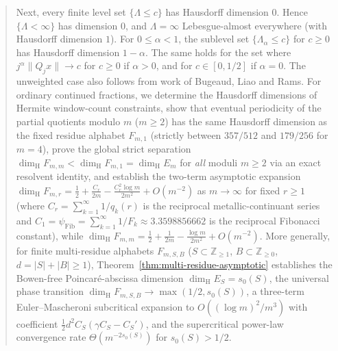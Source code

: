 \documentclass[11pt]{article}
\theoremstyle{definition}
\theoremstyle{remark}
\newcommand{\Z}{\mathbb{Z}}
\newcommand{\dimH}{\dim_{\mathrm{H}}}
\newcommand{\Lam}{\Lambda}
\begin{document}
\begin{abstract}
Next, every finite level set $\{\Lam\le c\}$ has Hausdorff dimension $0$.
Hence $\{\Lam<\infty\}$ has dimension $0$, and $\Lam=\infty$ Lebesgue-almost
everywhere (with Hausdorff dimension $1$). For $0\le\alpha<1$, the sublevel set $\{\Lam_\alpha\le c\}$ for $c\ge0$
has Hausdorff dimension $1-\alpha$. The same holds for the set where
$j^\alpha\|Q_jx\|\to c$ for $c\ge0$ if $\alpha>0$, and for
$c\in[0,1/2]$ if $\alpha=0$. The unweighted case also follows from work
of Bugeaud, Liao and Rams. For ordinary continued fractions,
we determine the Hausdorff dimensions of Hermite window-count constraints,
show that eventual periodicity of the partial quotients modulo $m$ ($m\ge2$) has
the same Hausdorff dimension as the fixed residue alphabet $F_{m,1}$ (strictly
between $357/512$ and $179/256$ for $m=4$), prove the global strict separation
$\dimH F_{m,m}<\dimH F_{m,1}=\dimH E_m$ for \emph{all} moduli $m\ge2$ via an
exact resolvent identity, and establish the two-term asymptotic expansion
$\dimH F_{m,r}=\frac12+\frac{C_r}{2m}-\frac{C_r^2\log m}{2m^2}+O(m^{-2})$ as
$m\to\infty$ for fixed $r\ge1$ (where $C_r=\sum_{k=1}^\infty 1/q_k(r)$ is the
reciprocal metallic-continuant series and $C_1=\psi_{\mathrm{Fib}}=\sum_{k=1}^\infty 1/F_k\approx3.3598856662$ is the reciprocal Fibonacci constant), while
$\dimH F_{m,m}=\frac12+\frac{1}{2m}-\frac{\log m}{2m^2}+O(m^{-2})$. More generally,
for finite multi-residue alphabets $F_{m,S,B}$ ($S\subset\Z_{\ge1}$,
$B\subset\Z_{\ge0}$, $d=|S|+|B|\ge1$), Theorem~\ref{thm:multi-residue-asymptotic}
establishes the Bowen-free Poincar\'e-abscissa dimension $\dimH E_S=s_0(S)$, the
universal phase transition $\dimH F_{m,S,B}\to\max(1/2,s_0(S))$, a three-term
Euler--Mascheroni subcritical expansion to $O((\log m)^2/m^3)$ with coefficient
$\frac12 d^2 C_S(\gamma C_S-C_S')$, and the supercritical power-law convergence
rate $\Theta(m^{-2s_0(S)})$ for $s_0(S)>1/2$.


\end{abstract}
\end{document}
